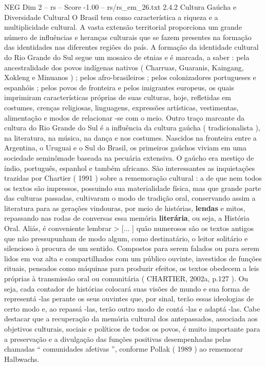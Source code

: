 \begin{textsample}{NEG Dim 2 – rs – Score -1.00 – rs/rs\_em\_26.txt}  \label{ex:f2_neg_215}
2.4.2 Cultura Gaúcha e Diversidade Cultural O Brasil tem como característica a riqueza e a multiplicidade cultural.
A vasta extensão territorial proporciona um grande número de influências e heranças culturais que se fazem presentes na formação das identidades nas diferentes regiões do país.
A formação da identidade cultural do Rio Grande do Sul segue um mosaico de etnias e é marcada, a saber : pela ancestralidade dos povos indígenas nativos ( Charruas, Guaranis, Kaingang, Xokleng e Minuanos ) ; pelos afro-brasileiros ; pelos colonizadores portugueses e espanhóis ; pelos povos de fronteira e pelos imigrantes europeus, os quais imprimiram características próprias de suas culturas, hoje, refletidas em costumes, crenças religiosas, linguagens, expressões artísticas, vestimentas, alimentação e modos de relacionar -se com o meio.
Outro traço marcante da cultura do Rio Grande do Sul é a influência da cultura gaúcha ( tradicionalista ), na literatura, na música, na dança e nos costumes.
Nascidos na fronteira entre a Argentina, o Uruguai e o Sul do Brasil, os primeiros gaúchos viviam em uma sociedade seminômade baseada na pecuária extensiva.
O gaúcho era mestiço de índio, português, espanhol e também africano.
São interessantes as inquietações trazidas por Chartier ( 1991 ) sobre a rememoração cultural : a de que nem todos os textos são impressos, possuindo sua materialidade física, mas que grande parte das culturas passadas, cultivaram o modo de tradição oral, conservando assim a literatura para as gerações vindouras, por meio de histórias, \textbf{lendas} e mitos, repassando nas rodas de conversas essa memória \textbf{literária}, ou seja, a História Oral.
Aliás, é conveniente lembrar > [... ] quão numerosos são os textos antigos que não pressupunham de modo algum, como destinatário, o leitor solitário e silencioso à procura de um sentido.
Compostos para serem falados ou para serem lidos em voz alta e compartilhados com um público ouvinte, investidos de funções rituais, pensados como máquinas para produzir efeitos, os textos obedecem a leis próprias à transmissão oral ou comunitária ( CHARTIER, 2002a, p.127 ).
Ou seja, cada contador de histórias colocará suas visões de mundo e sua forma de representá -las perante os seus ouvintes que, por sinal, terão essas ideologias de certo modo e, ao repassá -las, terão outro modo de contá -las e adaptá -las.
Cabe destacar que a recuperação da memória cultural dos antepassados, associada aos objetivos culturais, sociais e políticos de todos os povos, é muito importante para a preservação e a divulgação das funções positivas desempenhadas pelas chamadas “ comunidades afetivas ”, conforme Pollak ( 1989 ) ao rememorar Halbwachs.

\end{textsample}

